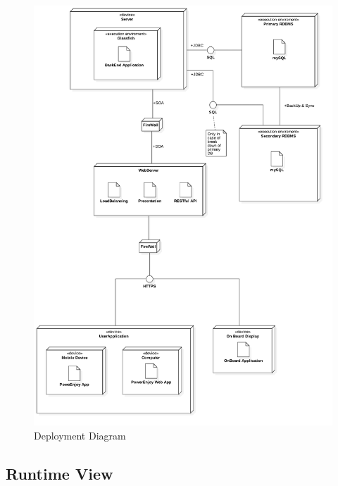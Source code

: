 \FloatBarrier
\begin{figure}
\centering
\hspace{-5mm}
\includegraphics[scale=0.38]{Images/DeployDiagram/Deploy2.png}
\caption{Deployment Diagram}
\end{figure}
\FloatBarrier


\subsection{Runtime View}
\newpage




